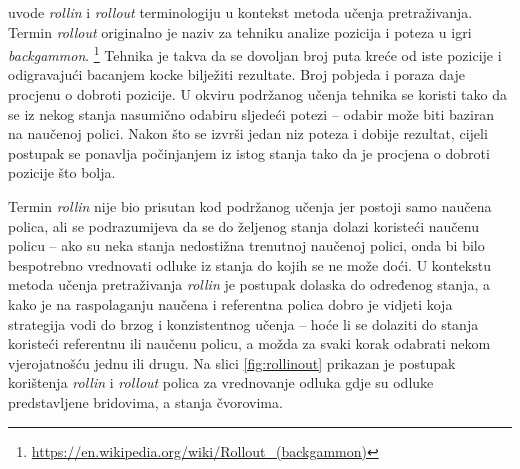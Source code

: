 \citet*{daume15lols} uvode \textit{rollin} i \textit{rollout} terminologiju u
kontekst metoda učenja pretraživanja. Termin \textit{rollout} originalno je
naziv za tehniku analize pozicija i poteza u igri \textit{backgammon}.
\footnote{\url{https://en.wikipedia.org/wiki/Rollout_(backgammon)}} Tehnika je
takva da se dovoljan broj puta kreće od iste pozicije i odigravajući bacanjem
kocke bilježiti rezultate. Broj pobjeda i poraza daje procjenu o dobroti
pozicije. U okviru podržanog učenja tehnika se koristi tako da se iz nekog
stanja nasumično odabiru sljedeći potezi -- odabir može biti baziran na naučenoj
polici. Nakon što se izvrši jedan niz poteza i dobije rezultat, cijeli postupak
se ponavlja počinjanjem iz istog stanja tako da je procjena o dobroti pozicije
što bolja.

Termin \textit{rollin} nije bio prisutan kod podržanog učenja jer postoji samo
naučena polica, ali se podrazumijeva da se do željenog stanja dolazi koristeći
naučenu policu -- ako su neka stanja nedostižna trenutnoj naučenoj polici, onda
bi bilo bespotrebno vrednovati odluke iz stanja do kojih se ne može doći. U
kontekstu metoda učenja pretraživanja \textit{rollin} je postupak dolaska do
određenog stanja, a kako je na raspolaganju naučena i referentna polica dobro je
vidjeti koja strategija vodi do brzog i konzistentnog učenja -- hoće li se
dolaziti do stanja koristeći referentnu ili naučenu policu, a možda za svaki
korak odabrati nekom vjerojatnošću jednu ili drugu. Na slici \ref{fig:rollinout}
prikazan je postupak korištenja \textit{rollin} i \textit{rollout} polica za
vrednovanje odluka gdje su odluke predstavljene bridovima, a stanja čvorovima.

